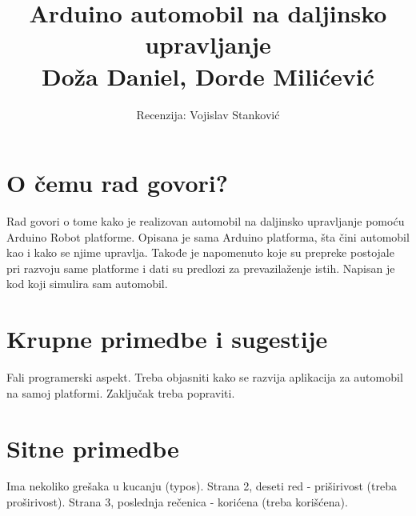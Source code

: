 \documentclass[a4paper]{article}
\begin{document}
	
	\title{Arduino automobil na daljinsko upravljanje\\ \small{Doža Daniel, Dorde Milićević}}
	
	\author{Recenzija: Vojislav Stanković}
	
	
	\maketitle
	
	
	
	
	\section{O čemu rad govori?}
	Rad govori o tome kako je realizovan automobil na daljinsko upravljanje pomoću Arduino Robot platforme.
	Opisana je sama Arduino platforma, šta čini automobil kao i kako se njime upravlja.
	Takođe je napomenuto koje su prepreke postojale pri razvoju same platforme i dati su predlozi za prevazilaženje istih.
	Napisan je kod koji simulira sam automobil.
	
	\section{Krupne primedbe i sugestije}
	Fali programerski aspekt. Treba objasniti kako se razvija aplikacija za automobil na samoj platformi.
	Zaključak treba popraviti.
	
	\section{Sitne primedbe}
	Ima nekoliko grešaka u kucanju (typos).
	Strana 2, deseti red - priširivost (treba proširivost).
	Strana 3, poslednja rečenica - korićena (treba korišćena).
	
\end{document}
